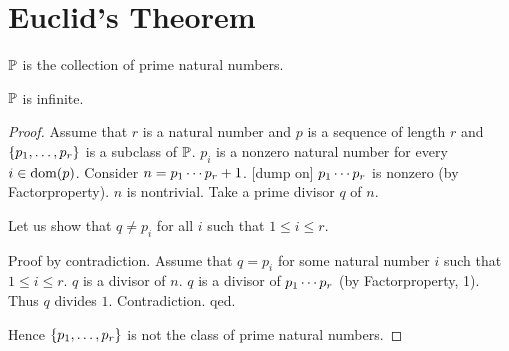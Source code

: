 \documentclass[11pt]{article}
\begin{document}
\section{Euclid's Theorem}

\begin{forthel}

\begin{signature}
$\mathbb{P}$ is the collection of prime natural numbers.
\end{signature}

\begin{theorem}[Euclid]
$\mathbb{P}$ is infinite.
\end{theorem}
\begin{proof}
Assume that $r$ is a natural number and
$p$ is a sequence of length $r$ and
$\{p_{1},\dots,p_{r}\}$ is a subclass of $\mathbb{P}$.
$p_{i}$ is a nonzero natural number for every
$i \in  \operatorname{dom}(p)$.
Consider $n=p_{1} \cdots p_{r}+1$.
[dump on]
$p_{1} \cdots p_{r}$ is nonzero (by Factorproperty).
$n$ is nontrivial.
Take a prime divisor $q$ of $n$.

Let us show that $q \neq p_{i}$ for all $i$ such that
$1 \leq i \leq r$.

Proof by contradiction.
Assume that $q=p_{i}$ for some natural number $i$ such that
$1 \leq i \leq r$.
$q$ is a divisor of $n$.
$q$ is a divisor of $p_{1} \cdots p_{r}$
(by Factorproperty, 1).
Thus $q$ divides $1$.
Contradiction. qed.

Hence $\{p_{1},\dots,p_{r}\}$ is not the class of prime natural numbers.
\end{proof}

\end{forthel}
\end{document}
